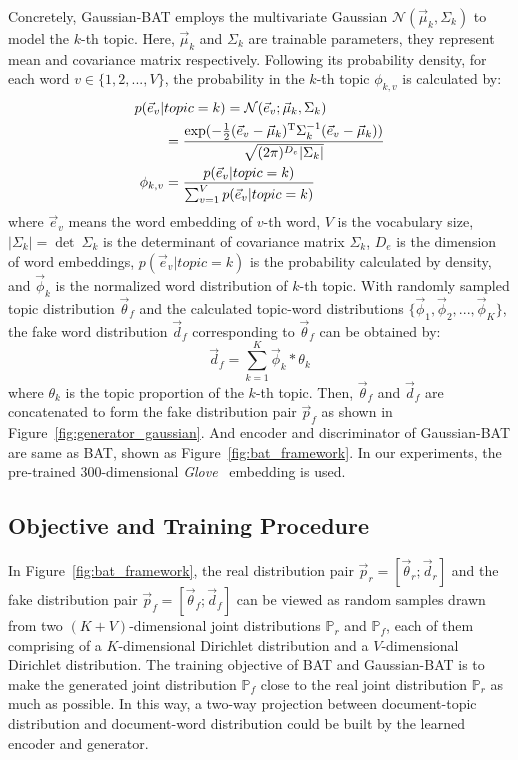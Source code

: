 \documentclass[11pt,a4paper]{article}
\begin{document}
Concretely, Gaussian-BAT employs the multivariate Gaussian $\mathcal N(\vec \mu_{k},\Sigma_{k})$ to model the $k$-th topic. Here, $\vec \mu_{k}$ and $\Sigma_{k}$ are trainable parameters, they represent mean and covariance matrix respectively. Following its probability density, for each word $v\in \{1,2,...,V\}$, the probability in the $k$-th topic $\phi_{k,v}$ is calculated by:
\begin{align}
p(\vec e_{v}|&topic=k)=\mathcal N(\vec e_{v};\vec \mu_{k},\Sigma_{k})\notag \\
&=\frac{\exp(-\frac{1}{2}(\vec e_{v}-\vec \mu_{k})^{\text{T}}\Sigma_{k}^{-1}(\vec e_{v}-\vec \mu_{k}))}{\sqrt{(2\pi)^{D_{e}}|\Sigma_{k}|} }\\
\phi_{k,v}&=\frac{p(\vec e_{v}|topic =k)}{\sum_{v=1}^{V}p(\vec e_{v}|topic=k)}
\end{align}
where $\vec e_{v}$ means the word embedding of $v$-th word, $V$ is the vocabulary size, $|\Sigma_{k}|=\det\ \Sigma_{k}$ is the determinant of covariance matrix $\Sigma_{k}$, $D_{e}$ is the dimension of word embeddings, $p(\vec e_{v}|topic=k)$ is the probability calculated by density, and $\vec \phi_{k}$ is the normalized word distribution of $k$-th topic. 
With randomly sampled topic distribution $\vec \theta_{f}$ and the calculated topic-word distributions $\{\vec \phi_{1},\vec \phi_{2},...,\vec \phi_{K}\}$, the fake word distribution $\vec d_{f}$ corresponding to $\vec \theta_{f}$ can be obtained by: 
\begin{equation}
\vec d_{f}=\sum_{k=1}^{K}\vec \phi_{k}*\theta_{k}
\end{equation}
where $\theta_{k}$ is the topic proportion of the $k$-th topic. Then, $\vec \theta_{f}$ and $\vec d_{f}$ are concatenated to form the fake distribution pair $\vec p_{f}$ as shown in Figure~\ref{fig:generator_gaussian}. And encoder and discriminator of Gaussian-BAT are same as BAT, shown as Figure~\ref{fig:bat_framework}. In our experiments, the pre-trained 300-dimensional \emph{Glove}~\cite{pennington2014glove} embedding is used. 


\subsection{Objective and Training Procedure}

In Figure~\ref{fig:bat_framework}, the real distribution pair $\vec p_{r}=[\vec \theta_{r};\vec d_{r}]$ and the fake distribution pair $\vec p_{f}=[\vec \theta_{f};\vec d_{f}]$ can be viewed as random samples drawn from two $(K+V)$-dimensional joint distributions $\mathbb{P}_{r}$ and $\mathbb{P}_{f}$, each of them comprising of a $K$-dimensional Dirichlet distribution and a $V$-dimensional Dirichlet distribution.  The training objective of BAT and Gaussian-BAT is to make the generated joint distribution $\mathbb{P}_{f}$ close to the real joint distribution $\mathbb{P}_{r}$ as much as possible. In this way, a two-way projection between document-topic distribution and document-word distribution could be built by the learned encoder and generator.
\end{document}

